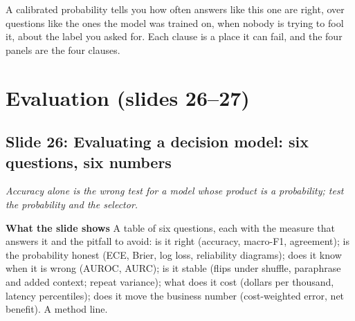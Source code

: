 \documentclass[11pt,letterpaper]{article}
\newcommand{\setstage}[1]{\colorlet{stagec}{#1}}
\newcommand{\slide}[3]{%
  \subsection[Slide #1: #2]{Slide #1: #2}%
  {\color{muted}\itshape #3\par}\medskip}
\newcommand{\para}[1]{\medskip\noindent\textbf{#1}\quad}
\newenvironment{intuition}{\begin{tcolorbox}[intuitionbox]}{\end{tcolorbox}}
\begin{document}
\begin{intuition}
A calibrated probability tells you how often answers like this one are right, over questions like the ones the model was trained on, when nobody is trying to fool it, about the label you asked for. Each clause is a place it can fail, and the four panels are the four clauses.
\end{intuition}

\setstage{outc}
\section{Evaluation (slides 26--27)}

\slide{26}{Evaluating a decision model: six questions, six numbers}{Accuracy alone is the wrong test for a model whose product is a probability; test the probability and the selector.}

\para{What the slide shows} A table of six questions, each with the measure that answers it and the pitfall to avoid: is it right (accuracy, macro-F1, agreement); is the probability honest (ECE, Brier, log loss, reliability diagrams); does it know when it is wrong (AUROC, AURC); is it stable (flips under shuffle, paraphrase and added context; repeat variance); what does it cost (dollars per thousand, latency percentiles); does it move the business number (cost-weighted error, net benefit). A method line.
\end{document}
